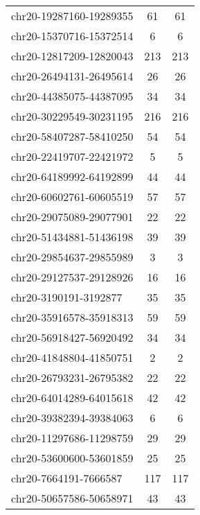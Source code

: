 \begin{longtable}{lSS}
	chr20-19287160-19289355 & 61     & 61                         \\
	chr20-15370716-15372514 & 6      & 6                          \\
	chr20-12817209-12820043 & 213    & 213                        \\
	chr20-26494131-26495614 & 26     & 26                         \\
	chr20-44385075-44387095 & 34     & 34                         \\
	chr20-30229549-30231195 & 216    & 216                        \\
	chr20-58407287-58410250 & 54     & 54                         \\
	chr20-22419707-22421972 & 5      & 5                          \\
	chr20-64189992-64192899 & 44     & 44                         \\
	chr20-60602761-60605519 & 57     & 57                         \\
	chr20-29075089-29077901 & 22     & 22                         \\
	chr20-51434881-51436198 & 39     & 39                         \\
	chr20-29854637-29855989 & 3      & 3                          \\
	chr20-29127537-29128926 & 16     & 16                         \\
	chr20-3190191-3192877   & 35     & 35                         \\
	chr20-35916578-35918313 & 59     & 59                         \\
	chr20-56918427-56920492 & 34     & 34                         \\
	chr20-41848804-41850751 & 2      & 2                          \\
	chr20-26793231-26795382 & 22     & 22                         \\
	chr20-64014289-64015618 & 42     & 42                         \\
	chr20-39382394-39384063 & 6      & 6                          \\
	chr20-11297686-11298759 & 29     & 29                         \\
	chr20-53600600-53601859 & 25     & 25                         \\
	chr20-7664191-7666587   & 117    & 117                        \\
	chr20-50657586-50658971 & 43     & 43                         \\

\end{longtable}
